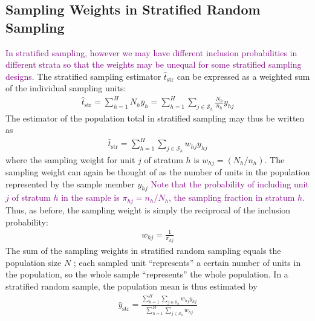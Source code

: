 \documentclass[a4paper,twoside,11pt]{article}
\begin{document}
\subsection{Sampling Weights in Stratified Random Sampling}
\textcolor{Purple}{In stratified sampling, however we may have different inclusion probabilities in different strata so that the weights may be unequal for some stratified sampling designs.}
\newline
\newline
The stratified sampling estimator $\hat{t}_{\text{str}}$ can be expressed as a weighted sum of the individual sampling units: 
\begin{equation*}
\begin{aligned}
\hat{t}_{\text{str}} = \sum^H_{h=1}N_h \bar{y}_h = \sum^H_{h=1} \sum_{j \in \mathcal{S}_h} \frac{N_h}{n_h} y_{hj}
\end{aligned}
\end{equation*}
The estimator of the population total in stratified sampling may thus be written as
\begin{equation*}
\begin{aligned}
\hat{t}_{\text{str}} = \sum^H_{h=1}\sum_{j \in \mathcal{S}_h} w_{hj} y_{hj}
\end{aligned}
\end{equation*}
where the sampling weight for unit $j$ of stratum $h$ is $w_{hj} = (N_h/n_h)$. The sampling weight can again be thought of as the number of units in the population represented by the sample member $y_{hj}$
\newline
\newline
\textcolor{Purple}{Note that the probability of including unit $j$ of stratum $h$ in the sample is $\pi_{hj} = n_h/N_h$, the sampling fraction in stratum $h$.} Thus, as before, the sampling weight is simply the reciprocal of the inclusion probability:
\begin{equation*}
\begin{aligned}
w_{hj} = \frac{1}{\pi_{hj}}
\end{aligned}
\end{equation*}
The sum of the sampling weights in stratified random sampling equals the population size $N$ ; each sampled unit “represents” a certain number of units in the population, so the whole sample “represents” the whole population. In a stratified random sample, the population mean is thus estimated by
\begin{equation*}
\begin{aligned}
\bar{y}_{\text{str}} = \frac{\sum^H_{h=1} \sum_{j \in \mathcal{S}_h}w_{hj} y_{hj}}{\sum^H_{h=1} \sum_{j \in \mathcal{S}_h}w_{hj}}
\end{aligned}
\end{equation*}
\end{document}
